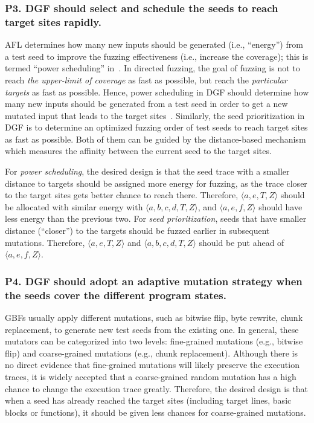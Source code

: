 \subsubsection{\textbf{P3}. DGF should select and schedule the seeds to reach target sites \textbf{rapidly}.} \label{subsec:p3}
 AFL determines how many new inputs should be generated (i.e., ``energy'') from a test seed to improve the fuzzing effectiveness (i.e., increase the coverage); this is termed ``power scheduling'' in~\cite{Bohme:2016:CGF,Bohme:2017:DGF}. In directed fuzzing, the goal of fuzzing is not to reach \emph{the upper-limit of coverage} as fast as possible, but reach the \emph{particular targets} as fast as possible. Hence, power scheduling in DGF should determine how many new inputs should be generated from a test seed in order to get a new mutated input that leads to the target sites~\cite{Bohme:2017:DGF}. Similarly, the seed prioritization in DGF is to determine an optimized fuzzing order of test seeds to reach target sites as fast as possible. Both of them can be guided by the distance-based mechanism which measures the affinity between the current seed to the target sites. 
 
 For \emph{power scheduling}, the desired design is that the seed trace with a smaller distance to targets should be assigned more energy for fuzzing, as the trace closer to the target sites gets better chance to reach there. Therefore, $\langle a, e, T, Z\rangle$ should be allocated with similar energy with $\langle a, b, c, d, T, Z\rangle$, and $\langle a, e, f, Z\rangle$ should have less energy than the previous two. For \emph{seed prioritization}, seeds that have smaller distance (``closer'') to the targets should be fuzzed earlier in subsequent mutations. Therefore, $\langle a, e, T, Z\rangle$ and $\langle a, b, c, d, T, Z\rangle$ should be put ahead of $\langle a, e, f, Z\rangle$.

\subsubsection{\textbf{P4}. DGF should adopt an \textbf{adaptive} mutation strategy when the seeds cover the different program states.}  \label{subsec:p4}
 GBFs usually apply different mutations, such as bitwise flip, byte rewrite, chunk replacement, to generate new test seeds from the existing one. 
In general, these mutators can be categorized into two levels: fine-grained mutations (e.g., bitwise flip) and coarse-grained mutations (e.g., chunk replacement).
 Although there is no direct evidence that fine-grained mutations will likely preserve the execution traces, it is widely accepted that a coarse-grained random mutation has a high chance to change the execution trace greatly. Therefore, the desired design is that when a seed has already reached the target sites (including target lines, basic blocks or functions), it should be given less chances for coarse-grained mutations.
 
